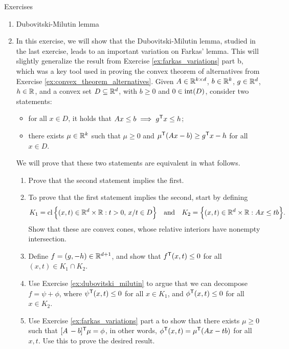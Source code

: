 \begin{xcb}{Exercises}
\begin{enumerate}[label=\thechapter.\arabic*]
\item \label{ex:dubovitski_milutin}
Dubovitski-Milutin lemma

\item \label{ex:farkas_variations_conic} 
  In this exercise, we will show that the Dubovitski-Milutin lemma, studied in
  the last exercise, leads to an important variation on Farkas' lemma. This will 
  slightly generalize the result from Exercise \ref{ex:farkas_variations} part
  b, which was a key tool used in proving the convex theorem of alternatives
  from Exercise \ref{ex:convex_theorem_alternatives}. Given $A \in \mathbb{R}^{k \times
    d}$, $b \in \mathbb{R}^k$, $g \in \mathbb{R}^d$, $h \in \mathbb{R}$, and a convex set $D \subseteq
  \mathbb{R}^d$, with $b \geq 0$ and $0 \in \operatorname{int}(D)$, consider two statements:       
  \begin{itemize}
  \item for all $x \in D$, it holds that $Ax \leq b \implies g^{\mathsf{T}} x \leq h$;  
  \item there exists $\mu \in \mathbb{R}^k$ such that $\mu \geq 0$ and $\mu^{\mathsf{T}} (Ax - b) 
    \geq g^{\mathsf{T}} x - h$ for all $x \in D$.
  \end{itemize}
  We will prove that these two statements are equivalent in what follows.

\begin{enumerate}[label=\alph*.]
\item Prove that the second statement implies the first.

\item To prove that the first statement implies the second, start by defining 
  \[
  K_1 = \operatorname{cl} \Big\{ (x,t) \in \mathbb{R}^d \times \mathbb{R}: t > 0, \, x/t \in D \Big\}
  \quad \text{and} \quad K_2 = \Big\{ (x,t) \in \mathbb{R}^d \times \mathbb{R}: Ax \leq tb
  \Big\}.  
  \]
  Show that these are convex cones, whose relative interiors have nonempty  
  intersection.

\item Define $f = (g,-h) \in \mathbb{R}^{d+1}$, and show that $f^{\mathsf{T}} (x,t) \leq 0$ for
  all $(x,t) \in K_1 \cap K_2$.  

\item Use Exercise \ref{ex:dubovitski_milutin} to argue that we can decompose
  $f = \psi + \phi$, where $\psi^{\mathsf{T}}(x,t) \leq 0$ for all $x \in K_1$, and
  $\phi^{\mathsf{T}} (x,t) \leq 0$ for all $x \in K_2$.

\item Use Exercise \ref{ex:farkas_variations} part a to show that there exists
  $\mu \geq 0$ such that $[A \, -b]^{\mathsf{T}} \mu = \phi$, in other words, $\phi^{\mathsf{T}}
  (x,t) = \mu^{\mathsf{T}} (Ax - tb)$ for all $x,t$. Use this to prove the desired result.       
\end{enumerate}


\end{enumerate}
\end{xcb}

